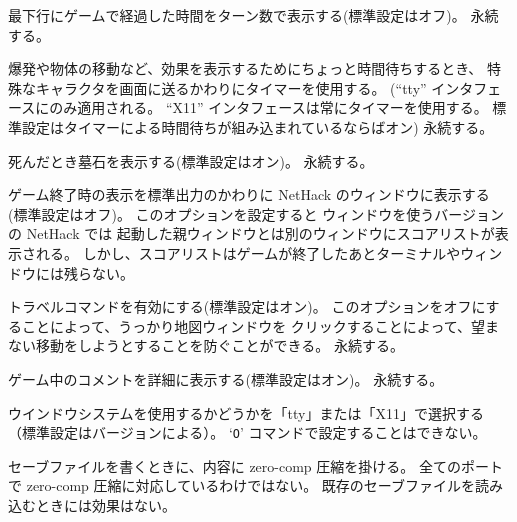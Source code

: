 最下行にゲームで経過した時間をターン数で表示する(標準設定はオフ)。
永続する。
\item[\ib{timed\verb+_+delay}]
爆発や物体の移動など、効果を表示するためにちょっと時間待ちするとき、
特殊なキャラクタを画面に送るかわりにタイマーを使用する。
(``tty'' インタフェースにのみ適用される。
``X11'' インタフェースは常にタイマーを使用する。
標準設定はタイマーによる時間待ちが組み込まれているならばオン)
永続する。
\item[\ib{tombstone}]
死んだとき墓石を表示する(標準設定はオン)。
永続する。
\item[\ib{toptenwin}]
ゲーム終了時の表示を標準出力のかわりに NetHack のウィンドウに表示する
(標準設定はオフ)。
このオプションを設定すると
ウィンドウを使うバージョンの NetHack では
起動した親ウィンドウとは別のウィンドウにスコアリストが表示される。
しかし、スコアリストはゲームが終了したあとターミナルやウィンドウには残らない。
\item[\ib{travel}]
トラベルコマンドを有効にする(標準設定はオン)。
このオプションをオフにすることによって、うっかり地図ウィンドウを
クリックすることによって、望まない移動をしようとすることを防ぐことができる。
永続する。
\item[\ib{verbose}]
ゲーム中のコメントを詳細に表示する(標準設定はオン)。
永続する。
\item[\ib{windowtype}]
ウインドウシステムを使用するかどうかを「tty」または「X11」で選択する
（標準設定はバージョンによる）。
`{\tt O}' コマンドで設定することはできない。
\item[\ib{zerocomp}]
セーブファイルを書くときに、内容に zero-comp 圧縮を掛ける。
全てのポートで zero-comp 圧縮に対応しているわけではない。
既存のセーブファイルを読み込むときには効果はない。
\elist

